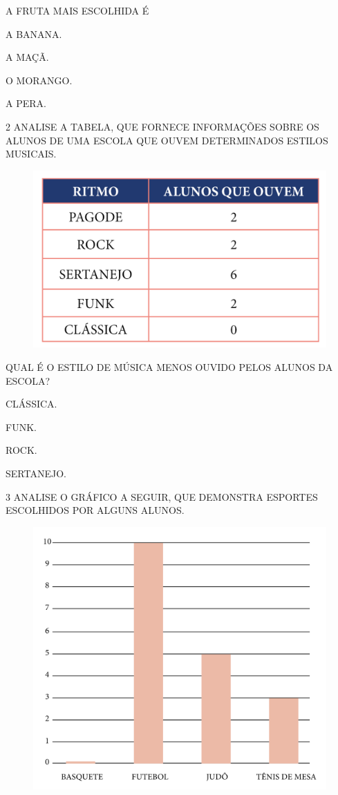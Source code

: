 A FRUTA MAIS ESCOLHIDA É

\begin{escolha}
\item A BANANA.

\item A MAÇÃ.

\item O MORANGO.

\item A PERA.
\end{escolha}

\num{2} ANALISE A TABELA, QUE FORNECE INFORMAÇÕES SOBRE OS ALUNOS DE UMA ESCOLA QUE OUVEM DETERMINADOS ESTILOS MUSICAIS.

\begin{figure}[htpb!]
\centering
\includegraphics[width=.6\textwidth]{./media/SAEB_1ANO_MAT_FIGURA110.png}
\end{figure}

\pagebreak
QUAL É O ESTILO DE MÚSICA MENOS OUVIDO PELOS ALUNOS DA ESCOLA?

\begin{escolha}
\item CLÁSSICA.

\item FUNK.

\item ROCK.

\item SERTANEJO.
\end{escolha}

\num{3} ANALISE O GRÁFICO A SEGUIR, QUE DEMONSTRA ESPORTES ESCOLHIDOS POR ALGUNS ALUNOS.

\begin{figure}[htpb!]
\centering
\includegraphics[width=.7\textwidth]{./media/SAEB_1ANO_MAT_FIGURA111.png}
\end{figure}

